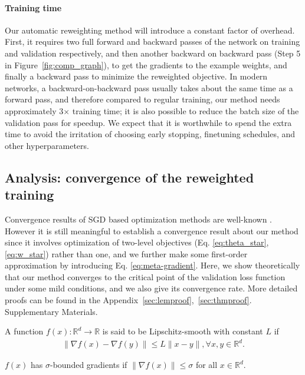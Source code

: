 \paragraph{Training time} Our automatic reweighting method will introduce a constant factor of
overhead. First, it requires two full forward and backward passes of the network on training and
validation respectively, and then another backward on backward pass (Step 5 in
Figure~\ref{fig:comp_graph}), to get the gradients to the example weights, and finally a backward
pass to minimize the reweighted objective. In modern networks, a backward-on-backward pass usually
takes about the same time as a forward pass, and therefore compared to regular training, our method
needs approximately 3$\times$ training time; it is also possible to reduce the batch size of the
validation pass for speedup. We expect that it is worthwhile to spend the extra time to avoid the
irritation of choosing early stopping, finetuning schedules, and other hyperparameters.

\subsection{Analysis: convergence of the reweighted training}
Convergence results of SGD based optimization methods are well-known \cite{svrg}. However it is
still meaningful to establish a convergence result about our method since it involves optimization
of two-level objectives (Eq. \ref{eq:theta_star}, \ref{eq:w_star}) rather than one, and we further
make some first-order approximation by introducing Eq. \ref{eq:meta-gradient}. Here, we show
theoretically that our method converges to the critical point of the validation loss function under
some mild conditions, and we also give its convergence rate. More detailed proofs can be found in
the 
\if{}
Appendix~\ref{sec:lemproof},~\ref{sec:thmproof}.
\else
Supplementary Materials.
\fi

\begin{deff}\label{deff:lipandbound}
A function $f(x): \mathbb{R}^d \to \mathbb{R}$ is said to be Lipschitz-smooth with constant $L$ if
\begin{align*}
\lVert \nabla f(x) - \nabla f(y) \rVert \leq L \lVert x - y \rVert, \forall x, y \in \mathbb{R}^d.
\end{align*}
\end{deff}
\begin{deff}
$f(x)$ has $\sigma$-bounded gradients if $\lVert \nabla f(x) \rVert \leq \sigma$ for all $x \in
\mathbb{R}^d$.
\end{deff}

